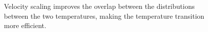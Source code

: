\documentclass[11pt]{article}
\begin{document}
\begin{figure}[h]
\begin{center}
  \caption{
    \label{fig:overlap}
    Velocity scaling improves the overlap
    between the distributions between the two temperatures,
    making the temperature transition more efficient.
  }
\end{center}
\end{figure}




\end{document}
